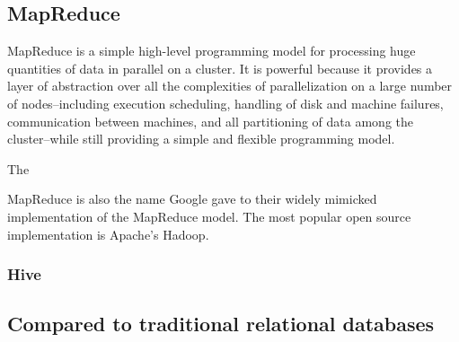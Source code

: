 \documentclass[11pt,a4paper]{report}
\begin{document}
\subsection*{MapReduce}
MapReduce is a simple high-level programming model for processing huge quantities of data in parallel on a cluster. It is powerful because it provides a layer of abstraction over all the complexities of parallelization on a large number of nodes--including  execution scheduling, handling of disk and machine failures, communication between machines, and all partitioning of data among the cluster--while still providing a simple and flexible programming model.\cite{dean2008mapreduce}

The 

MapReduce is also the name Google gave to their widely mimicked implementation of the MapReduce model. The most popular open source implementation is Apache's Hadoop. 
\subsubsection*{Hive}

\subsection*{Compared to traditional relational databases}

\pagebreak


\end{document}
